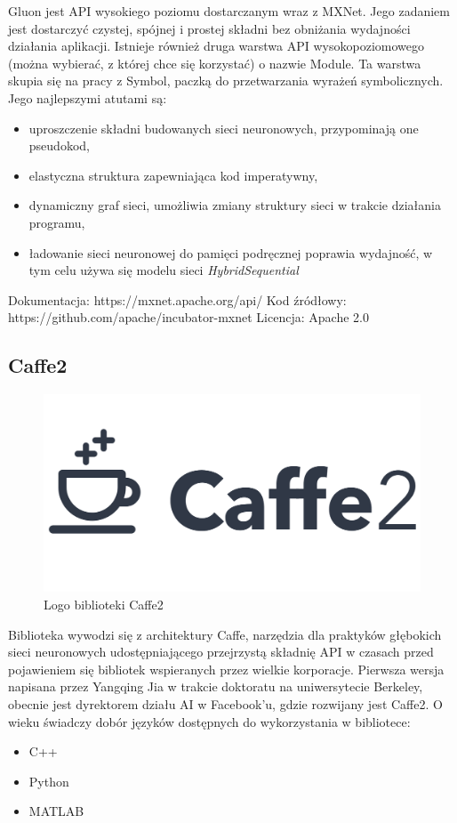 \documentclass[12pt,a4paper,twoside,titlepage,openright]{book}
\begin{document}
Gluon jest API wysokiego poziomu dostarczanym wraz z MXNet. Jego zadaniem jest dostarczyć czystej, spójnej i prostej składni bez obniżania wydajności działania aplikacji. Istnieje również druga warstwa API wysokopoziomowego (można wybierać, z której chce się korzystać) o nazwie Module. Ta warstwa skupia się na pracy z Symbol, paczką do przetwarzania wyrażeń symbolicznych.\cite{DBLP:journals/corr/ChenLLLWWXXZZ15} Jego najlepszymi atutami są:
\begin{itemize}
\item uproszczenie składni budowanych sieci neuronowych, przypominają one pseudokod,
\item elastyczna struktura zapewniająca kod imperatywny,
\item dynamiczny graf sieci, umożliwia zmiany struktury sieci w trakcie działania programu,
\item ładowanie sieci neuronowej do pamięci podręcznej poprawia wydajność, w tym celu używa się modelu sieci \textit{HybridSequential}
\end{itemize}

\noindent 
\newline
Dokumentacja: https://mxnet.apache.org/api/
\newline
Kod źródłowy: https://github.com/apache/incubator-mxnet
\newline
Licencja: Apache 2.0

\subsection{Caffe2}
\begin{figure}[h]
	\centering
			\includegraphics[resolution=100, scale=0.35]{Caffe2.png}
		\caption{Logo biblioteki Caffe2}
\end{figure}

Biblioteka wywodzi się z architektury Caffe, narzędzia dla praktyków głębokich sieci neuronowych udostępniającego przejrzystą składnię API w czasach przed pojawieniem się bibliotek wspieranych przez wielkie korporacje. Pierwsza wersja napisana przez Yangqing Jia w trakcie doktoratu na uniwersytecie Berkeley, obecnie jest dyrektorem działu AI w Facebook'u, gdzie rozwijany jest Caffe2. \cite{jia2014caffe} O wieku świadczy dobór języków dostępnych do wykorzystania w bibliotece:
\begin{itemize}
\item C++
\item Python
\item MATLAB
\end{itemize}
\end{document}
